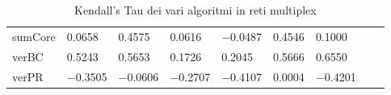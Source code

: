 \begin{table}
{\begin{tabular}{L{4.5em}R{4.5em}R{4.5em}R{4.5em}R{5.0em}R{4.5em}R{5.0em}R{-1.0em}R{-1.0em}}
              sumCore &     {\num{ 0.0658}} &     {\num{ 0.4575}} &     {\num{ 0.0616}} &     {\num{-0.0487}} &     {\num{ 0.4546}} &     {\num{ 0.1000}} & & \\
                verBC &     {\num{ 0.5243}} &     {\num{ 0.5653}} &     {\num{ 0.1726}} &     {\num{ 0.2045}} &     {\num{ 0.5666}} &     {\num{ 0.6550}} & & \\
                verPR &     {\num{-0.3505}} &     {\num{-0.0606}} &     {\num{-0.2707}} &     {\num{-0.4107}} &     {\num{ 0.0004}} &     {\num{-0.4201}} & & \\
          \bottomrule
      \end{tabular}
    }
    \caption{Kendall's Tau dei vari algoritmi in reti multiplex}
\end{table}